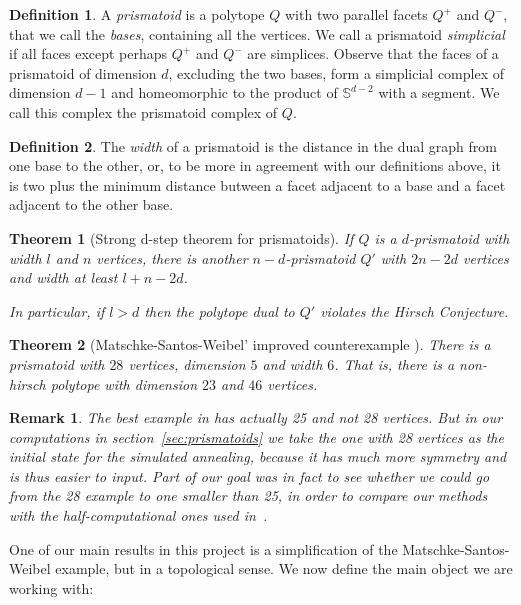 \documentclass[12pt,a4paper]{article}
\theoremstyle{plain}
\newtheorem{theorem}{Theorem}
\newtheorem*{remark}{Remark}
\theoremstyle{definition}
\newtheorem{definition}{Definition}
\begin{document}
\begin{definition}
  A \emph{prismatoid} is a polytope $Q$ with two parallel facets $Q^+$ and $Q^-$, that we call the \emph{bases}, containing all the vertices. We call a prismatoid \emph{simplicial} if all faces except perhaps $Q^+$ and $Q^-$ are simplices. Observe that the faces of a prismatoid of dimension $d$, excluding the two bases, form a simplicial complex of dimension $d-1$ and homeomorphic to the product of $\mathbb{S}^{d-2}$ with a segment. We call this complex the prismatoid complex of $Q$.
\end{definition}
\begin{definition}
  The \emph{width} of a prismatoid is the distance in the dual graph from one base to the other, or, to be more in agreement with our definitions above, it is two plus the minimum distance butween a facet adjacent to a base and a facet adjacent to the other base.
\end{definition}

\begin{theorem}[Strong d-step theorem for prismatoids\cite{counterexample}]
  If $Q$ is a $d$-prismatoid with width $l$ and $n$ vertices, there is another $n-d$-prismatoid $Q'$ with $2n-2d$ vertices and width at least $l+n-2d$.

  In particular, if $l>d$ then the polytope dual to $Q'$ violates the Hirsch Conjecture.
\end{theorem}

\begin{theorem}[Matschke-Santos-Weibel' improved counterexample \cite{improvement}]
There is a prismatoid with $28$ vertices, dimension $5$ and width $6$. That is, there is a non-hirsch polytope with dimension $23$ and $46$ vertices.
\end{theorem}

\begin{remark}
The best example in \cite{improvement} has actually 25 and not 28 vertices. But in our computations in section~\ref{sec:prismatoids} we take the one with 28 vertices as the initial state for the simulated annealing, because it has much more symmetry and is thus easier to input. Part of our goal was in fact to see whether we could go from the 28 example to one smaller than 25, in order to compare our methods with the half-computational ones used in~\cite{improvement}.
\end{remark}

One of our main results in this project is a simplification of the Matschke-Santos-Weibel example, but in a topological sense. We now define the main object we are working with:
\end{document}
